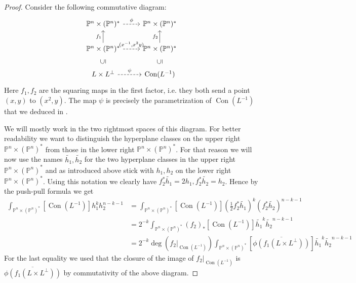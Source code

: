 \documentclass[12pt,a4paper,english]{scrartcl}
\newcommand{\PP}{\mathbb{P}}
\DeclareMathOperator{\Con}{Con}
\begin{document}
\begin{proof}
  Consider the following commutative diagram: \begin{equation}
  \label{eq:diagramforsquaring}
      \begin{tikzcd}
          \PP^n\times (\PP^n)^* \arrow[r,dashed,"\phi"] & \PP^n\times (\PP^n)^* \\
        \PP^n\times (\PP^n)^* \arrow[u,"f_1"]\arrow[r,dashed, "{(x^{-1},x^2y)}"] & \PP^n\times (\PP^n)^* \arrow[u,"f_2"]\\
        L\times L^\perp \arrow[r,dashed,"\psi"] \arrow[u,"\subseteq",phantom,sloped] & \Con(L^{-1}) \arrow[u,"\subseteq",phantom,sloped]
      \end{tikzcd}
  \end{equation}
  Here $f_1,f_2$ are the squaring maps in the first factor, i.e. they both send a point $(x,y)$ to $(x^2,y)$. The map $\psi$ is precisely the parametrization of $\Con(L^{-1})$ that we deduced in .

  We will mostly work in the two rightmost spaces of this diagram. For better readability we want to distinguish the hyperplane classes on the upper right $\PP^n\times (\PP^n)^*$ from those in the lower right $\PP^n\times (\PP^n)^*$. For that reason we will now use the names $\widetilde{h_1},\widetilde{h_2}$ for the two hyperplane classes in the upper right $\PP^n\times (\PP^n)^*$ and as introduced above stick with $h_1,h_2$ on the lower right $\PP^n\times (\PP^n)^*$. Using this notation we clearly have $f_2^*\widetilde{h_1}=2h_1, f_2^*\widetilde{h_2}=h_2$. Hence by the push-pull formula we get \begin{align*}
      \int_{\PP^n\times (\PP^n)^*}[\Con(L^{-1})]h_1^kh_2^{n-k-1}&=\int_{\PP^n\times (\PP^n)^*}[\Con(L^{-1})]\left(\frac{1}{2}f_2^*\widetilde{h_1}\right)^k(f_2^*\widetilde{h_2})^{n-k-1}\\&=2^{-k}\int_{\PP^n\times (\PP^n)^*}(f_2)_*[\Con(L^{-1})]\widetilde{h_1}^k\widetilde{h_2}^{n-k-1} \\
      &=2^{-k}\deg(f_2|_{\Con(L^{-1})})\int_{\PP^n\times (\PP^n)^*}[\overline{\phi(f_1(L\times L^\perp))}]\widetilde{h_1}^k\widetilde{h_2}^{n-k-1}
  \end{align*}
  For the last equality we used that the closure of the image of $f_2|_{\Con(L^{-1})}$ is $\overline{\phi(f_1(L\times L^\perp))}$ by commutativity of the above diagram.


\end{proof}
\end{document}
